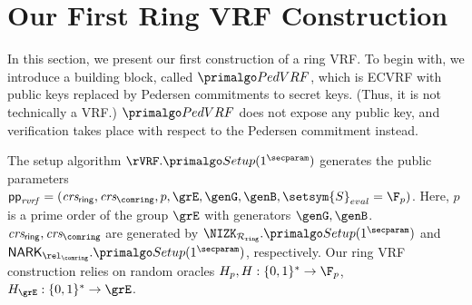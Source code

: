 
\def\tmpaux{\aux \doubleplus \piring \doubleplus \comring}
\def\tmpeprintaux{\eprint{\aux'}{\tmpaux}}
\def\tmpindent{\hspace*{5pt}}
\section{Our First Ring VRF Construction}%
\label{sec:pedersen_vrf}

In this section, we present our first construction of a ring VRF.  To begin with, we introduce a building block, called $\PedVRF$, which is ECVRF with public keys replaced by Pedersen commitments to secret keys. 
(Thus, it is not technically a VRF.)  $\PedVRF$ does not expose any public key, and verification takes place with respect to the Pedersen commitment instead.

The setup algorithm $ \rVRF.\Setup(1^\secparam) $ generates the public parameters $ \pprvrf = (\crsrvrf, \allowbreak \crsnark, p,\grE, \genG,\genB, \setsym{S}_{eval}  = \F_p)$. Here, $ p $ is a prime order of the group $ \grE $ with generators $ \genG,\genB $.  $ \crsrvrf, \crsnark $ are generated by $ \NIZK_{\Rring}.\Setup(1^\secparam) $ and $ \NARK_{\relcomring}.\Setup(1^\secparam) $, respectively. Our ring VRF construction relies on random oracles $H_p,H: \{0,1\}^* \to \F_p$, $H_{\grE}: \{0,1\}^* \to \grE$.




